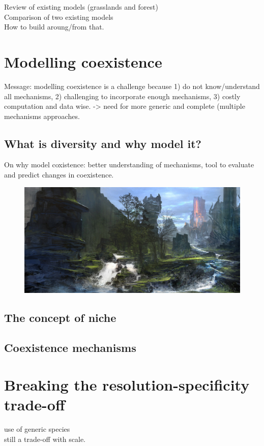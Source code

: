 Review of existing models (grasslands and forest)\\
Comparison of two existing models\\
How to build aroung/from that.\\


\section{Modelling coexistence}
Message: modelling coexistence is a challenge because 1) do not know/understand all mechanisms, 2) challenging to incorporate enough mechanisms, 3) costly computation and data wise. -> need for more generic and complete (multiple mechanisms approaches.

\subsection{What is diversity and why model it?}

On why model coxistence: better understanding of mechanisms, tool to evaluate and predict changes in coexistence.

\begin{figure}
\includegraphics[scale=1]{./1_Introduction/graphics/plankton.jpg}
\end{figure}

\subsection{The concept of niche}


\subsection{Coexistence mechanisms}

\section{Breaking the resolution-specificity trade-off}
use of generic species\\
still a trade-off with scale.

